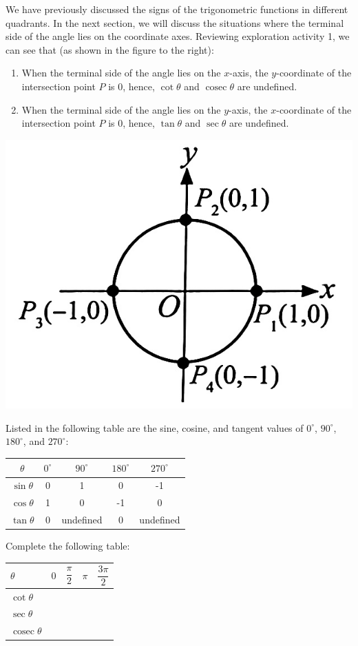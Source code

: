 \documentclass{report}
\begin{document}
\begin{vwcol}[widths={0.6,0.4}, sep=4mm, justify=flush, rule=0pt]
    We have previously discussed the signs of the trigonometric functions in different quadrants. In the next section, we will discuss the situations where the terminal side of the angle lies on the coordinate axes. Reviewing exploration activity 1, we can see that (as shown in the figure to the right):
    
    \noindent \parbox{0.58\textwidth}{\begin{enumerate}[label=(\roman*),leftmargin=*]
        \item When the terminal side of the angle lies on the $x$-axis, the $y$-coordinate of the intersection point $P$ is 0, hence, $\cot\theta$ and $\operatorname{cosec}\theta$ are undefined.
        \item When the terminal side of the angle lies on the $y$-axis, the $x$-coordinate of the intersection point $P$ is 0, hence, $\tan\theta$ and $\sec\theta$ are undefined.
    \end{enumerate}}
    
    \includegraphics[width=0.34\linewidth]{assets/9-18.jpg}
\end{vwcol}
\vspace{-2em}
Listed in the following table are the sine, cosine, and tangent values of $0^\circ$, $90^\circ$, $180^\circ$, and $270^\circ$:
\begin{center}
    \begin{tabular}{|c|c|c|c|c|}
        \hline$\theta$ & $0^{\circ}$ & $90^{\circ}$ & $180^{\circ}$ & $270^{\circ}$ \\
        \hline $\sin \theta$ & 0 & 1 & 0 & -1 \\
        \hline $\cos \theta$ & 1 & 0 & -1 & 0 \\
         \hline $\tan \theta$ & 0 & undefined & 0 & undefined \\
        \hline
        \end{tabular}
\end{center}


Complete the following table:
\begin{center}
    \begin{tabularx}{0.8\textwidth}{|Y|Y|Y|Y|Y|}
        \hline$\theta$ & $0$ & $\dfrac{\pi}{2}$ & $\pi$ & $\dfrac{3 \pi}{2}$ \\
        \hline $\cot \theta$ & & & & \\
        \hline $\sec \theta$ & & & & \\
        \hline $\operatorname{cosec} \theta$ & & & & \\
        \hline
        \end{tabularx}
\end{center}
\end{document}
